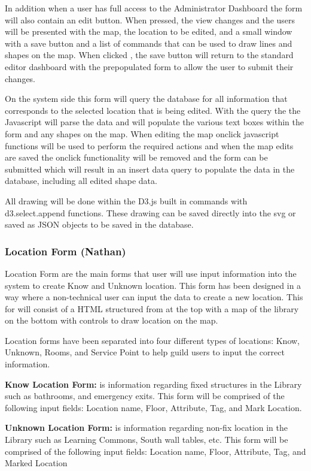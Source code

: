 \documentclass[letterpaper,10pt,titlepage, onecolumn, compsoc]{IEEEtran}
\begin{document}
In addition when a user has full access to the Administrator Dashboard the form will also contain an edit button. When pressed, the view changes and the users will be presented with the map,  the location to be edited, and a small window with a save button and a list of commands that can be used to draw lines and shapes on the map. When clicked , the save button will return to the standard editor dashboard with the prepopulated form to allow the user to submit their changes. 

On the system side this form will query the database for all information that corresponds to the selected location that is being edited. With the query the the Javascript will parse the data and will populate the various text boxes within the form and any shapes on the map. When editing the map onclick javascript functions will be used to perform the required actions and when the map edits are saved the onclick functionality will be removed and the form can be submitted which will result in an insert data query to populate the data in the database, including all edited shape data.

All drawing will be done within the D3.js built in commands with d3.select.append functions. These drawing can be saved directly into the svg or saved as JSON objects to be saved in the database.

\subsubsection{Location Form (Nathan)}
Location Form are the main forms that user will use input information into the system to create Know and Unknown location. This form has been designed in a way where a non-technical user can input the data to create a new location. This for will consist of a HTML structured from at the top with a map of the library on the bottom with controls to draw location on the map. 

Location forms have been separated into four different types of locations: Know, Unknown, Rooms, and Service Point to help guild users to input the correct information.

\textbf{Know Location Form:} is information regarding fixed structures in the Library such as bathrooms, and emergency exits. This form will be comprised of the following input fields: Location name, Floor, Attribute, Tag, and Mark Location.

\textbf{Unknown Location Form:} is information regarding non-fix location in the Library such as Learning Commons, South wall tables, etc. This form will be comprised of the following input fields: Location name, Floor, Attribute, Tag, and Marked Location
\end{document}
